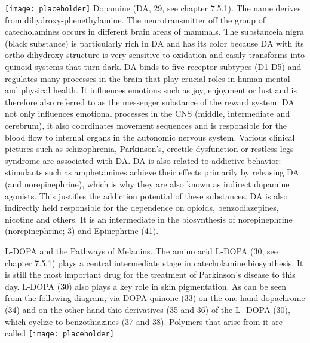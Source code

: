 \texttt{[image: placeholder]}
Dopamine (DA, 29, see chapter 7.5.1). The name derives
from dihydroxy-phenethylamine. The neurotransmitter off
the group of catecholamines occurs in different brain areas of mammals. The substanceia nigra (black substance) is particularly rich in DA and has its color because DA with its ortho-dihydroxy structure is very sensitive to oxidation and easily transforms into quinoid systems that turn dark.
DA binds to five receptor subtypes (D1-D5) and regulates many processes in the brain that play crucial roles in human mental and physical health. It influences emotions such as joy, enjoyment or lust and is therefore also referred to as the messenger substance of the reward system. DA not only influences emotional processes in the CNS (middle, intermediate and cerebrum), it also coordinates movement sequences and is responsible for the blood flow to internal organs in the autonomic nervous system. Various clinical pictures such as schizophrenia, Parkinson's, erectile dysfunction or restless legs syndrome are associated with DA. DA is also related to addictive behavior: stimulants such as amphetamines achieve their effects primarily by releasing DA (and norepinephrine), which is why they are also known as indirect dopamine agonists.
This justifies the addiction potential of these substances. DA is also indirectly held responsible for the dependence on opioids, benzodiazepines, nicotine and others. It is an intermediate in the biosynthesis of norepinephrine (norepinephrine; 3) and Epinephrine (41).
\clearpage

L-DOPA and the Pathways of Melanins. The amino acid L-DOPA (30, see chapter 7.5.1) plays a central intermediate stage in catecholamine biosynthesis. It is still the most important drug for the treatment of Parkinson's disease to this day.
L-DOPA (30) also plays a key role in skin pigmentation. As can be seen from the following diagram, via DOPA quinone (33) on the one hand dopachrome (34) and on the other hand thio derivatives (35 and 36) of the L- DOPA (30), which cyclize to benzothiazines (37 and 38). Polymers that arise from it are called
\texttt{[image: placeholder]}
\clearpage

